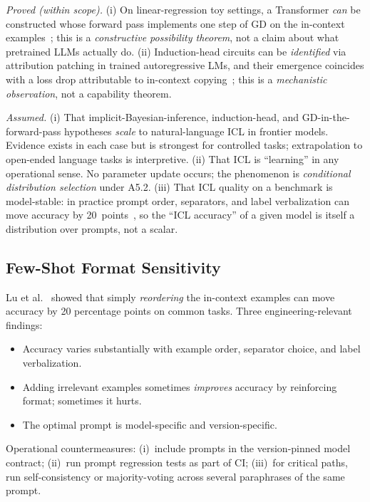 \begin{provedassumed}
\emph{Proved (within scope).}
(i) On linear-regression toy settings, a Transformer \emph{can} be
constructed whose forward pass implements one step of GD on the
in-context examples~\citep{vonoswald2023transformers}; this is a
\emph{constructive possibility theorem}, not a claim about what
pretrained LLMs actually do.
(ii) Induction-head circuits can be \emph{identified} via
attribution patching in trained autoregressive LMs, and their
emergence coincides with a loss drop attributable to in-context
copying~\citep{olsson2022induction}; this is a \emph{mechanistic
observation}, not a capability theorem.

\emph{Assumed.}
(i) That implicit-Bayesian-inference, induction-head, and
GD-in-the-forward-pass hypotheses \emph{scale} to natural-language
ICL in frontier models. Evidence exists in each case but is
strongest for controlled tasks; extrapolation to open-ended language
tasks is interpretive.
(ii) That ICL is ``learning'' in any operational sense. No parameter
update occurs; the phenomenon is \emph{conditional distribution
selection} under A5.2.
(iii) That ICL quality on a benchmark is model-stable: in practice
prompt order, separators, and label verbalization can move accuracy
by 20~points~\citep{lu2022fantastically}, so the ``ICL accuracy'' of
a given model is itself a distribution over prompts, not a scalar.
\end{provedassumed}

\subsection{Few-Shot Format Sensitivity}

Lu et al.~\citep{lu2022fantastically} showed that simply
\emph{reordering} the in-context examples can move accuracy by 20
percentage points on common tasks. Three engineering-relevant
findings:
\begin{itemize}
  \item Accuracy varies substantially with example order, separator
        choice, and label verbalization.
  \item Adding irrelevant examples sometimes \emph{improves} accuracy
        by reinforcing format; sometimes it hurts.
  \item The optimal prompt is model-specific and version-specific.
\end{itemize}
Operational countermeasures:
(i)~include prompts in the version-pinned model contract;
(ii)~run prompt regression tests as part of CI;
(iii)~for critical paths, run self-consistency or majority-voting
across several paraphrases of the same prompt.

